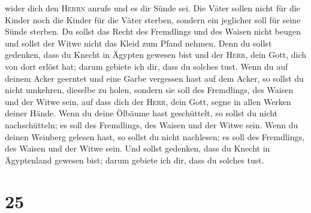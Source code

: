 wider dich den \textsc{Herrn} anrufe und es dir Sünde sei.
 Die Väter sollen nicht für die Kinder noch die Kinder
für die Väter sterben, sondern ein jeglicher soll für seine Sünde
sterben.  Du sollst das Recht des Fremdlings und des
Waisen nicht beugen und sollst der Witwe nicht das Kleid zum Pfand
nehmen.  Denn du sollst gedenken, dass du Knecht in
Ägypten gewesen bist und der \textsc{Herr}, dein Gott, dich von dort
erlöst hat; darum gebiete ich dir, dass du solches tust. 
Wenn du auf deinem Acker geerntet und eine Garbe vergessen hast auf dem
Acker, so sollst du nicht umkehren, dieselbe zu holen, sondern sie soll
des Fremdlings, des Waisen und der Witwe sein, auf dass dich der
\textsc{Herr}, dein Gott, segne in allen Werken deiner Hände.
 Wenn du deine Ölbäume hast geschüttelt, so sollst du
nicht nachschütteln; es soll des Fremdlings, des Waisen und der Witwe
sein.  Wenn du deinen Weinberg gelesen hast, so sollst du
nicht nachlesen; es soll des Fremdlings, des Waisen und der Witwe sein.
 Und sollst gedenken, dass du Knecht in Ägyptenland
gewesen bist; darum gebiete ich dir, dass du solches tust.

\hypertarget{section-24}{%
\section{25}\label{section-24}}


